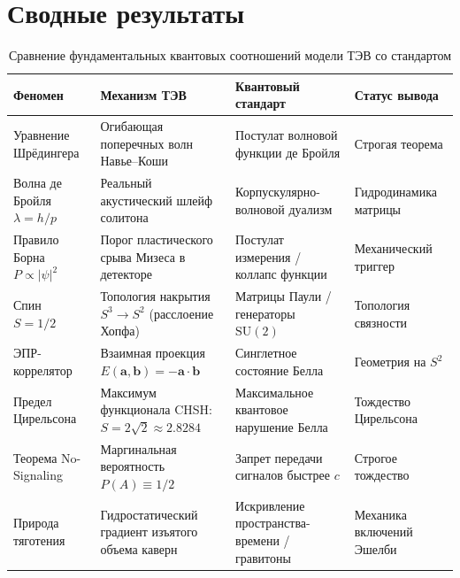 \documentclass[11pt,a4paper]{article}
\theoremstyle{definition}
\theoremstyle{remark}
\begin{document}
\section{Сводные результаты}

\begin{table}[htbp]
\centering
\small
\setlength{\tabcolsep}{4pt}
\caption{Сравнение фундаментальных квантовых соотношений модели ТЭВ со стандартом}
\label{tab:quantum_summary}
\vspace{2mm}
\begin{tabularx}{\textwidth}{>{\raggedright\arraybackslash\hsize=0.85\hsize}X >{\raggedright\arraybackslash\hsize=1.2\hsize}X >{\raggedright\arraybackslash\hsize=1.15\hsize}X >{\centering\arraybackslash\hsize=0.8\hsize}X}
\toprule
\textbf{Феномен} & \textbf{Механизм ТЭВ} & \textbf{Квантовый стандарт} & \textbf{Статус вывода} \\
\midrule
Уравнение Шрёдингера & Огибающая поперечных волн Навье--Коши & Постулат волновой функции де Бройля & Строгая теорема \\
\addlinespace[1mm]
Волна де Бройля $\lambda = h/p$ & Реальный акустический шлейф солитона & Корпускулярно-волновой дуализм & Гидродинамика матрицы \\
\addlinespace[1mm]
Правило Борна $P \propto |\psi|^2$ & Порог пластического срыва Мизеса в детекторе & Постулат измерения / коллапс функции & Механический триггер \\
\addlinespace[1mm]
Спин $S = 1/2$ & Топология накрытия $S^3 \to S^2$ (расслоение Хопфа) & Матрицы Паули / генераторы $\mathrm{SU}(2)$ & Топология связности \\
\addlinespace[1mm]
ЭПР-коррелятор & Взаимная проекция $E(\mathbf{a},\mathbf{b}) = -\mathbf{a}\cdot\mathbf{b}$ & Синглетное состояние Белла & Геометрия на $S^2$ \\
\addlinespace[1mm]
Предел Цирельсона & Максимум функционала CHSH: $S = 2\sqrt{2} \approx 2.8284$ & Максимальное квантовое нарушение Белла & Тождество Цирельсона \\
\addlinespace[1mm]
Теорема No-Signaling & Маргинальная вероятность $P(A) \equiv 1/2$ & Запрет передачи сигналов быстрее $c$ & Строгое тождество \\
\addlinespace[1mm]
Природа тяготения & Гидростатический градиент изъятого объема каверн & Искривление пространства-времени / гравитоны & Механика включений Эшелби \\
\bottomrule
\end{tabularx}
\end{table}
\end{document}
